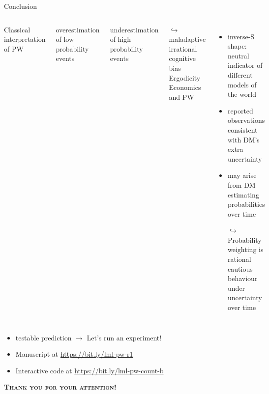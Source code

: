 \begin{frame}{Conclusion}
\begin{columns}[T]
Classical interpretation of PW
\bi
  \item overestimation of low probability events
  \item underestimation of high probability events
	\item[$\hookrightarrow$]	maladaptive irrational cognitive bias
\ei
{}
Ergodicity Economics and PW
\begin{itemize}
  \item inverse-S shape: neutral indicator of different models of the world
	\item reported observations consistent with DM's extra uncertainty
	\item may arise from DM estimating probabilities over time
  \item[$\hookrightarrow$] Probability weighting is rational cautious behaviour under uncertainty over time
\end{itemize}
\end{columns}
\vfill
\begin{itemize}
  \item testable prediction $\to$ Let's run an experiment!
  \item Manuscript at \url{https://bit.ly/lml-pw-r1}
  \item Interactive code at \url{https://bit.ly/lml-pw-count-b}    
\end{itemize}

\pause
\centering
\vfill
{\Large \textsc{\textbf{Thank you for your attention!}}}

\end{frame}
